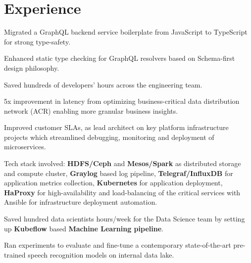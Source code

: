 \documentclass[]{deedy-resume-openfont}
\begin{document}
\hfill
\begin{minipage}[t]{0.66\textwidth} 


\section{Experience}
\vspace{\topsep}
\begin{tightemize}
\item Migrated a GraphQL backend service boilerplate from JavaScript to TypeScript for strong type-safety.
\item Enhanced static type checking for GraphQL resolvers based on Schema-first design philosophy.
\item Saved hundreds of developers' hours across the engineering team.
\end{tightemize}
\sectionsep

\begin{tightemize}
\item 5x improvement in latency from optimizing business-critical data distribution network (ACR) enabling more granular business insights.
\item Improved customer SLAs, as lead architect on key platform infrastructure projects which streamlined debugging, monitoring and deployment of microservices. 
\item Tech stack involved: \textbf{HDFS/Ceph} and \textbf{Mesos/Spark} as distributed storage and compute cluster, \textbf{Graylog} based log pipeline, \textbf{Telegraf/InfluxDB} for application metrics collection, \textbf{Kubernetes} for application deployment, \textbf{HaProxy} for high-availability and load-balancing of the critical services with Ansible for infrastructure deployment automation.
\item Saved hundred data scientists hours/week for the Data Science team by setting up \textbf{Kubeflow} based \textbf{Machine Learning pipeline}.
\item Ran experiments to evaluate and fine-tune a contemporary state-of-the-art pre-trained speech recognition models on internal data lake.
\end{tightemize}
\sectionsep


\end{minipage}
\end{document}
